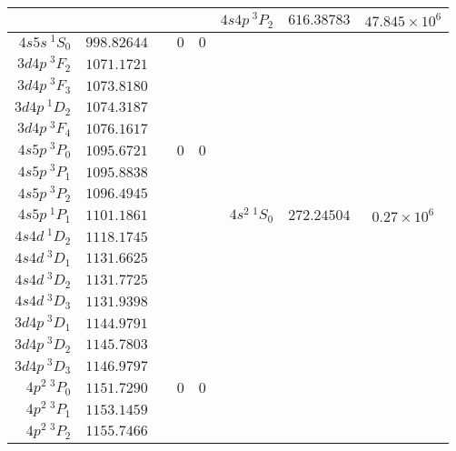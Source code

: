 \documentclass[aps,prx,10pt]{revtex4-2}
\begin{document}
\begin{longtable}{|r|c|c|c|c|r|c|c|}
\cline{6-8}
&&&&&$4s4p\ {}^{\mathrm{3}}\!P_2$&$616.38783$&$47.845\times10^{6}$\cite{zhouMagicPhys.Rev.A2010}\\
\hline
$4s5s\ {}^{\mathrm{1}}\!S_0$&$998.82644$&&$0$&$0$&&&\\
\hline
$3d4p\ {}^{\mathrm{3}}\!F_2$&$1071.1721$&&&&&&\\
\hline
$3d4p\ {}^{\mathrm{3}}\!F_3$&$1073.8180$&&&&&&\\
\hline
$3d4p\ {}^{\mathrm{1}}\!D_2$&$1074.3187$&&&&&&\\
\hline
$3d4p\ {}^{\mathrm{3}}\!F_4$&$1076.1617$&&&&&&\\
\hline
$4s5p\ {}^{\mathrm{3}}\!P_0$&$1095.6721$&&$0$&$0$&&&\\
\hline
$4s5p\ {}^{\mathrm{3}}\!P_1$&$1095.8838$&&&&&&\\
\hline
$4s5p\ {}^{\mathrm{3}}\!P_2$&$1096.4945$&&&&&&\\
\hline
$4s5p\ {}^{\mathrm{1}}\!P_1$&$1101.1861$&&&&$4s^2\ {}^{\mathrm{1}}\!S_0$&$272.24504$&$0.27\times10^6$\cite{zhouMagicPhys.Rev.A2010}\\
\hline
$4s4d\ {}^{\mathrm{1}}\!D_2$&$1118.1745$&&&&&&\\
\hline
$4s4d\ {}^{\mathrm{3}}\!D_1$&$1131.6625$&&&&&&\\
\hline
$4s4d\ {}^{\mathrm{3}}\!D_2$&$1131.7725$&&&&&&\\
\hline
$4s4d\ {}^{\mathrm{3}}\!D_3$&$1131.9398$&&&&&&\\
\hline
$3d4p\ {}^{\mathrm{3}}\!D_1$&$1144.9791$&&&&&&\\
\hline
$3d4p\ {}^{\mathrm{3}}\!D_2$&$1145.7803$&&&&&&\\
\hline
$3d4p\ {}^{\mathrm{3}}\!D_3$&$1146.9797$&&&&&&\\
\hline
$4p^2\ {}^{\mathrm{3}}\!P_0$&$1151.7290$&&$0$&$0$&&&\\
\hline
$4p^2\ {}^{\mathrm{3}}\!P_1$&$1153.1459$&&&&&&\\
\hline
$4p^2\ {}^{\mathrm{3}}\!P_2$&$1155.7466$&&&&&&\\
\hline
\end{longtable}



\end{document}
